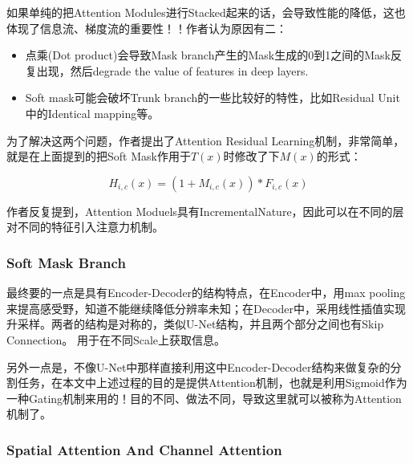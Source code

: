 如果单纯的把Attention Modules进行Stacked起来的话，会导致性能的降低，这也体现了信息流、梯度流的重要性！！作者认为原因有二：
\begin{itemize}
\item 点乘(Dot product)会导致Mask branch产生的Mask生成的0到1之间的Mask反复出现，然后degrade the value of features in deep layers.
\item Soft mask可能会破坏Trunk branch的一些比较好的特性，比如Residual Unit中的Identical mapping等。
\end{itemize}

为了解决这两个问题，作者提出了Attention Residual Learning机制，非常简单，就是在上面提到的把Soft Mask作用于$T(x)$时修改了下$M(x)$的形式：

\begin{displaymath}
H_{i, c}(x) = (1 + M_{i, c}(x)) * F_{i, c}(x)
\end{displaymath}

作者反复提到，Attention Moduels具有IncrementalNature，因此可以在不同的层对不同的特征引入注意力机制。    

\subsubsection{Soft Mask Branch}

最终要的一点是具有Encoder-Decoder的结构特点，在Encoder中，用max pooling来提高感受野，知道不能继续降低分辨率未知；在Decoder中，采用线性插值实现升采样。两者的结构是对称的，类似U-Net结构，并且两个部分之间也有Skip Connection。
用于在不同Scale上获取信息。

另外一点是，不像U-Net中那样直接利用这中Encoder-Decoder结构来做复杂的分割任务，在本文中上述过程的目的是提供Attention机制，也就是利用Sigmoid作为一种Gating机制来用的！目的不同、做法不同，导致这里就可以被称为Attention机制了。

\subsubsection{Spatial Attention And Channel Attention}

